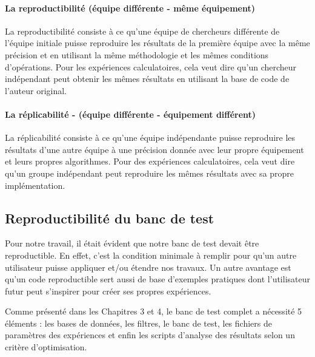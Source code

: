 \paragraph{La reproductibilité (équipe différente - même équipement)}

La reproductibilité consiste à ce qu'une équipe de chercheurs différente de l'équipe initiale puisse reproduire les résultats de la première équipe avec la même précision et en utilisant la même méthodologie et les mêmes conditions d'opérations. Pour les expériences calculatoires, cela veut dire qu'un chercheur indépendant peut obtenir les mêmes résultats en utilisant la base de code de l'auteur original.

\paragraph{La réplicabilité - (équipe différente - équipement différent)}

La réplicabilité consiste à ce qu'une équipe indépendante puisse reproduire les résultats d'une autre équipe à une précision donnée avec leur propre équipement et leurs propres algorithmes. Pour des expériences calculatoires, cela veut dire qu'un groupe indépendant peut reproduire les mêmes résultats avec sa propre implémentation.

\subsection{Reproductibilité du banc de test}

Pour notre travail, il était évident que notre banc de test devait être reproductible. En effet, c'est la condition minimale à remplir pour qu'un autre utilisateur puisse appliquer et/ou étendre nos travaux. Un autre avantage est qu'un code reproductible sert aussi de base d'exemples pratiques dont l'utilisateur futur peut s'inspirer pour créer ses propres expériences.

Comme présenté dans les Chapitres 3 et 4, le banc de test complet a nécessité 5 éléments : les bases de données, les filtres, le banc de test, les fichiers de paramètres des expériences et enfin les scripts d'analyse des résultats selon un critère d'optimisation.

